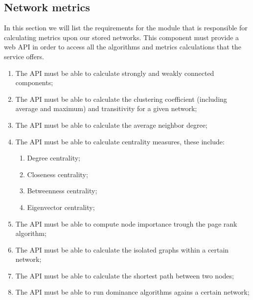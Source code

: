 \subsection{Network metrics}

In this section we will list the requirements for the module that is responsible for calculating metrics upon our stored networks. This component must
provide a web API in order to access all the algorithms and metrics calculations that the service offers.

\begin{enumerate}
    \item The API must be able to calculate strongly and weakly connected components;
    \item The API must be able to calculate the clustering coefficient (including average and maximum) and transitivity for a given network;
    \item The API must be able to calculate the average neighbor degree;
    \item The API must be able to calculate centrality measures, these include:
    \begin{enumerate}
        \item Degree centrality;
        \item Closeness centrality;
        \item Betweenness centrality;
        \item Eigenvector centrality;
    \end{enumerate}
    \item The API must be able to compute node importance trough the page rank algorithm;
    \item The API must be able to calculate the isolated graphs within a certain network;
    \item The API must be able to calculate the shortest path between two nodes;
    \item The API must be able to run dominance algorithms agains a certain network;
\end{enumerate}
